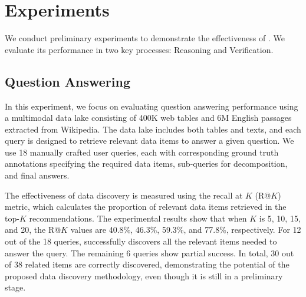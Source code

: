 \section{Experiments}
\label{sec:exp}

We conduct preliminary experiments to demonstrate the effectiveness of \sys. 
We evaluate its performance in two key processes: Reasoning and Verification. %



\subsection{Question Answering}

 In this experiment, we focus on evaluating question answering performance using a multimodal data lake consisting of 400K web tables and 6M English passages extracted from Wikipedia. The data lake includes both tables and texts, and each query is designed to retrieve relevant data items to answer a given question. We use 18 manually crafted user queries, each with corresponding ground truth annotations specifying the required data items, sub-queries for decomposition, and final answers.

The effectiveness of data discovery is measured using the recall at $K$ (R@$K$) metric, which calculates the proportion of relevant data items retrieved in the top-$K$ recommendations. The experimental results show that when $K$ is 5, 10, 15, and 20, the R@$K$ values are 40.8\%, 46.3\%, 59.3\%, and 77.8\%, respectively. For 12 out of the 18 queries, \sys successfully discovers all the relevant items needed to answer the query. The remaining 6 queries show partial success. In total, 30 out of 38 related items are correctly discovered, demonstrating the potential of the proposed data discovery methodology, even though it is still in a preliminary stage.


